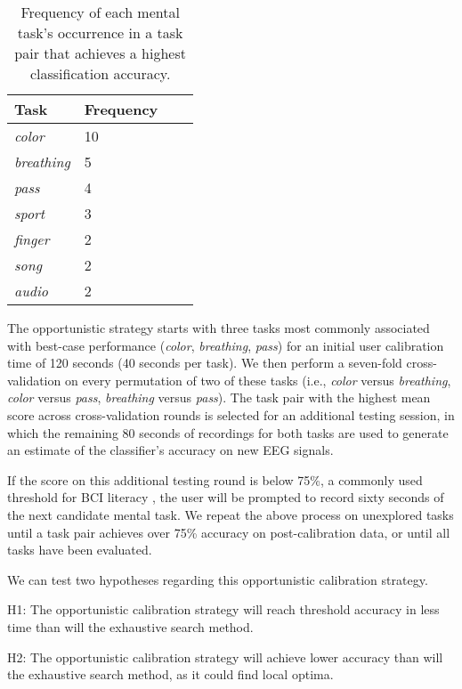 \begin{table}[!h]
  \centering
  \begin{tabular}{ | l | l | l | p{5cm} |}
  \hline
  Task & Frequency \\ \hline
  \textit{color} & 10 \\ \hline
  \textit{breathing} & 5 \\ \hline
  \textit{pass} & 4 \\ \hline
  \textit{sport} & 3 \\ \hline
  \textit{finger} & 2 \\ \hline
  \textit{song} & 2 \\ \hline
  \textit{audio} & 2 \\ \hline
  \end{tabular}
  \caption{Frequency of each mental task's occurrence in a task pair that achieves a highest classification accuracy.}
  \label{table:name}
\end{table}

The opportunistic strategy starts with three tasks most commonly associated with best-case performance (\textit{color}, \textit{breathing}, \textit{pass}) for an initial user calibration time of 120 seconds (40 seconds per task). We then perform a seven-fold cross-validation on every permutation of two of these tasks (i.e., \textit{color} versus \textit{breathing}, \textit{color} versus \textit{pass}, \textit{breathing} versus \textit{pass}). The task pair with the highest mean score across cross-validation rounds is selected for an additional testing session, in which the remaining 80 seconds of recordings for both tasks are used to generate an estimate of the classifier's accuracy on new EEG signals.

If the score on this additional testing round is below 75\%, a commonly used threshold for BCI literacy \cite{vidaurre_towards_2010}, the user will be prompted to record sixty seconds of the next candidate mental task. We repeat the above process on unexplored tasks until a task pair achieves over 75\% accuracy on post-calibration data, or until all tasks have been evaluated.

We can test two hypotheses regarding this opportunistic calibration strategy.

H1: The opportunistic calibration strategy will reach threshold accuracy in less time than will the exhaustive search method.

H2: The opportunistic calibration strategy will achieve lower accuracy than will the exhaustive search method, as it could find local optima.

